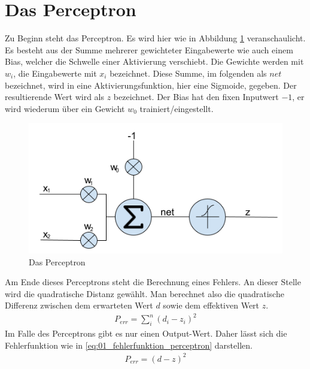 \section{Das Perceptron}
Zu Beginn steht das Perceptron. Es wird hier wie in Abbildung \ref{fig:04_perceptron} veranschaulicht.
Es besteht aus der Summe mehrerer gewichteter Eingabewerte wie auch einem Bias, welcher
die Schwelle einer Aktivierung verschiebt. Die Gewichte werden mit $w_i$, die Eingabewerte mit $x_i$ bezeichnet.
Diese Summe, im folgenden als $net$ bezeichnet, wird in eine Aktivierungsfunktion,
hier eine Sigmoide, gegeben. Der resultierende Wert wird als $z$ bezeichnet. Der Bias hat den fixen Inputwert $-1$,
er wird wiederum über ein Gewicht $w_0$ trainiert/eingestellt.

\begin{figure}[h!]
    \begin{center}
        \includegraphics[width=0.6\linewidth]{../common/01_neuronal_network/00_resources/00_perceptron.png}
    \end{center}
    \caption{Das Perceptron}
    \label{fig:04_perceptron}
\end{figure}

Am Ende dieses Perceptrons steht die Berechnung eines Fehlers. An dieser Stelle wird die quadratische Distanz gewählt.
Man berechnet also die quadratische Differenz zwischen dem erwarteten Wert $d$ sowie dem effektiven Wert $z$.
\begin{align}
    P_{err} = \sum_i^n(d_i - z_i)^2
\end{align}
Im Falle des Perceptrons gibt es nur einen Output-Wert. Daher lässt sich die Fehlerfunktion wie in \ref{eq:01_fehlerfunktion_perceptron}
darstellen.
\begin{align}
    P_{err} = (d - z)^2\label{eq:01_fehlerfunktion_perceptron}
\end{align}

